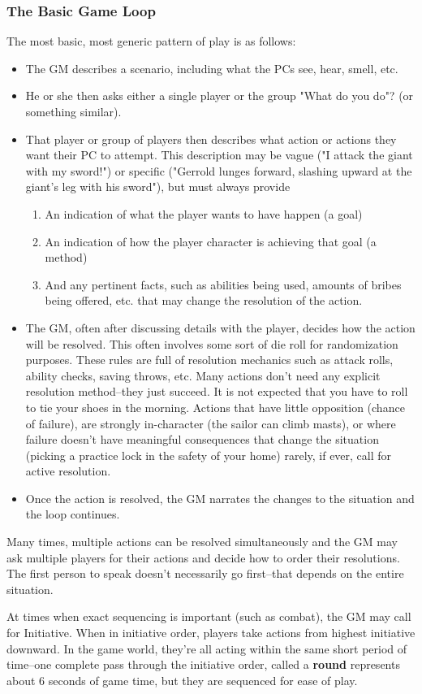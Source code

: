 \subsubsection{The Basic Game Loop}
The most basic, most generic pattern of play is as follows:
\begin{itemize}
    \item The GM describes a scenario, including what the PCs see, hear, smell, etc.
    \item He or she then asks either a single player or the group "What do you do"? (or something similar).
    \item That player or group of players then describes what action or actions they want their PC to attempt. This description may be vague ("I attack the giant with my sword!") or specific ("Gerrold lunges forward, slashing upward at the giant's leg with his sword"), but must always provide
    \begin{enumerate}
        \item An indication of what the player wants to have happen (a goal)
        \item An indication of how the player character is achieving that goal (a method)
        \item And any pertinent facts, such as abilities being used, amounts of bribes being offered, etc. that may change the resolution of the action.
    \end{enumerate}
    \item The GM, often after discussing details with the player, decides how the action will be resolved. This often involves some sort of die roll for randomization purposes. These rules are full of resolution mechanics such as attack rolls, ability checks, saving throws, etc. Many actions don't need any explicit resolution method--they just succeed. It is not expected that you have to roll to tie your shoes in the morning. Actions that have little opposition (chance of failure), are strongly in-character (the sailor can climb masts), or where failure doesn't have meaningful consequences that change the situation (picking a practice lock in the safety of your home) rarely, if ever, call for active resolution.
    \item Once the action is resolved, the GM narrates the changes to the situation and the loop continues.
\end{itemize}

Many times, multiple actions can be resolved simultaneously and the GM may ask multiple players for their actions and decide how to order their resolutions. The first person to speak doesn't necessarily go first--that depends on the entire situation.

At times when exact sequencing is important (such as combat), the GM may call for Initiative. When in initiative order, players take actions from highest initiative downward. In the game world, they're all acting within the same short period of time--one complete pass through the initiative order, called a \textbf{round} represents about 6 seconds of game time, but they are sequenced for ease of play.
